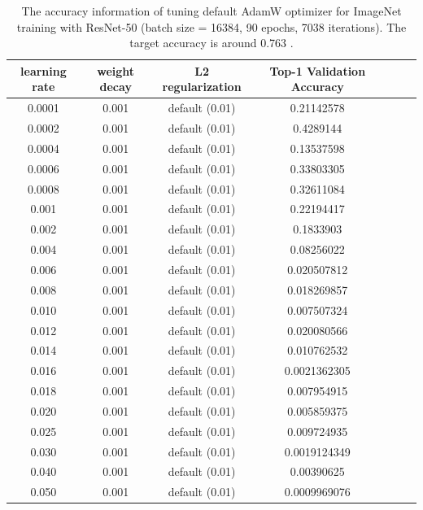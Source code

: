 \begin{table}[ht]
\renewcommand{\arraystretch}{1.3}
\caption{The accuracy information of tuning default AdamW optimizer for ImageNet training with ResNet-50 (batch size = 16384, 90 epochs, 7038 iterations). The target accuracy is around 0.763 \citep{goyal2017accurate}.}
\centering
\begin{tabular}{|c|c|c|c|c|c|c|}
\hline
learning rate & weight decay & L2 regularization & Top-1 Validation Accuracy\\
\hline
\hline
0.0001 & 0.001 & default (0.01) & 0.21142578 \\
\hline
0.0002 & 0.001 & default (0.01) & 0.4289144 \\
\hline
0.0004 & 0.001 & default (0.01) & 0.13537598 \\
\hline
0.0006 & 0.001 & default (0.01) & 0.33803305 \\
\hline
0.0008 & 0.001 & default (0.01) & 0.32611084 \\
\hline
0.001 & 0.001 & default (0.01) & 0.22194417 \\
\hline
0.002 & 0.001 & default (0.01) & 0.1833903 \\
\hline
0.004 & 0.001 & default (0.01) & 0.08256022 \\
\hline
0.006 & 0.001 & default (0.01) & 0.020507812 \\
\hline
0.008 & 0.001 & default (0.01) & 0.018269857 \\
\hline
0.010 & 0.001 & default (0.01) & 0.007507324 \\
\hline
0.012 & 0.001 & default (0.01) & 0.020080566 \\
\hline
0.014 & 0.001 & default (0.01) & 0.010762532 \\
\hline
0.016 & 0.001 & default (0.01) & 0.0021362305 \\
\hline
0.018 & 0.001 & default (0.01) & 0.007954915 \\
\hline
0.020 & 0.001 & default (0.01) & 0.005859375 \\
\hline
0.025 & 0.001 & default (0.01) & 0.009724935 \\
\hline
0.030 & 0.001 & default (0.01) & 0.0019124349 \\
\hline
0.040 & 0.001 & default (0.01) & 0.00390625 \\
\hline
0.050 & 0.001 & default (0.01) & 0.0009969076 \\
\hline
\end{tabular}
\label{table:imagenet_adamw_default_l2_3}
\end{table}

